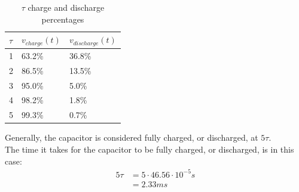 \begin{table}[H]
\center
\begin{tabular}{|l|l|l|}
\hline
$\tau$ & $v_{charge}(t)$ & $v_{discharge}(t)$ \\ \hline
1      & 63.2\%       & 36.8\%         \\ \hline
2      & 86.5\%       & 13.5\%         \\ \hline
3      & 95.0\%       & 5.0\%          \\ \hline
4      & 98.2\%       & 1.8\%          \\ \hline
5      & 99.3\%       & 0.7\%          \\ \hline
\end{tabular}
\caption{$\tau$ charge and discharge percentages}
\end{table}
\noindent Generally, the capacitor is considered fully charged, or discharged, at $5\tau$. \\
The time it takes for the capacitor to be fully charged, or discharged, is in this case:
\begin{align*}
5\tau &= 5 \cdot 46.56 \cdot 10^{-5} s \\
&= 2.33 ms
\end{align*}

